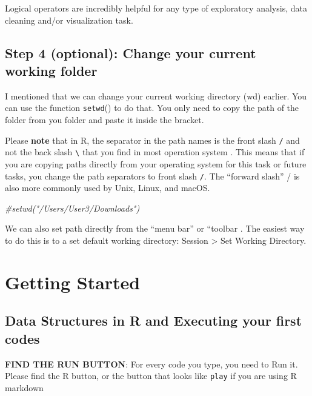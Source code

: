 \documentclass[
]{article}
\newenvironment{Shaded}{\begin{snugshade}}{\end{snugshade}}
\newcommand{\CommentTok}[1]{\textcolor[rgb]{0.56,0.35,0.01}{\textit{#1}}}
\begin{document}
Logical operators are incredibly helpful for any type of exploratory
analysis, data cleaning and/or visualization task.

\hypertarget{step-4-optional-change-your-current-working-folder}{%
\subsection{Step 4 (optional): Change your current working
folder}\label{step-4-optional-change-your-current-working-folder}}

I mentioned that we can change your current working directory (wd)
earlier. You can use the function \texttt{setwd}() to do that. You only
need to copy the path of the folder from you folder and paste it inside
the bracket.

Please \textbf{note} that in R, the separator in the path names is the
front slash \texttt{/} and not the back slash \texttt{\textbackslash{}}
that you find in most operation system . This means that if you are
copying paths directly from your operating system for this task or
future tasks, you change the path separators to front slash \texttt{/}.
The ``forward slash'' / is also more commonly used by Unix, Linux, and
macOS.

\begin{Shaded}
\begin{Highlighting}[]
\CommentTok{\#setwd("/Users/User3/Downloads")}
\end{Highlighting}
\end{Shaded}

We can also set path directly from the ``menu bar'' or ``toolbar . The
easiest way to do this is to a set default working directory: Session
\textgreater{} Set Working Directory.

\hypertarget{getting-started}{%
\section{Getting Started}\label{getting-started}}

\hypertarget{data-structures-in-r-and-executing-your-first-codes}{%
\subsection{Data Structures in R and Executing your first
codes}\label{data-structures-in-r-and-executing-your-first-codes}}

\textbf{FIND THE RUN BUTTON}: For every code you type, you need to Run
it. Please find the R button, or the button that looks like
\texttt{play} if you are using R markdown
\end{document}

